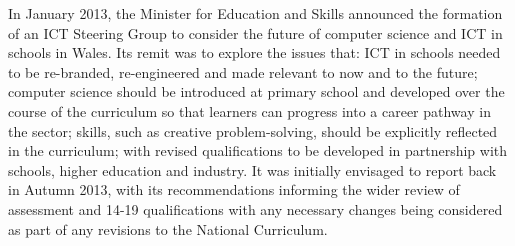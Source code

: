 \documentclass[conference]{IEEEtran}
\begin{document}


In January 2013, the Minister for Education and Skills
announced the formation of an ICT Steering Group to consider
the future of computer science and ICT in schools in Wales.
Its remit was to explore the issues that: ICT in
schools needed to be re-branded, re-engineered and made relevant to now
and to the future; computer science should be introduced at primary
school and developed over the course of the curriculum so that
learners can progress into a career pathway in the sector; skills,
such as creative problem-solving, should be explicitly reflected in
the curriculum; with revised qualifications to be developed in
partnership with schools, higher education and industry. 
It was initially envisaged to report back in Autumn 2013, with
its recommendations informing the wider review of assessment and 14-19
qualifications %
with any necessary changes
being considered as part of any revisions to the National Curriculum.

\end{document}
